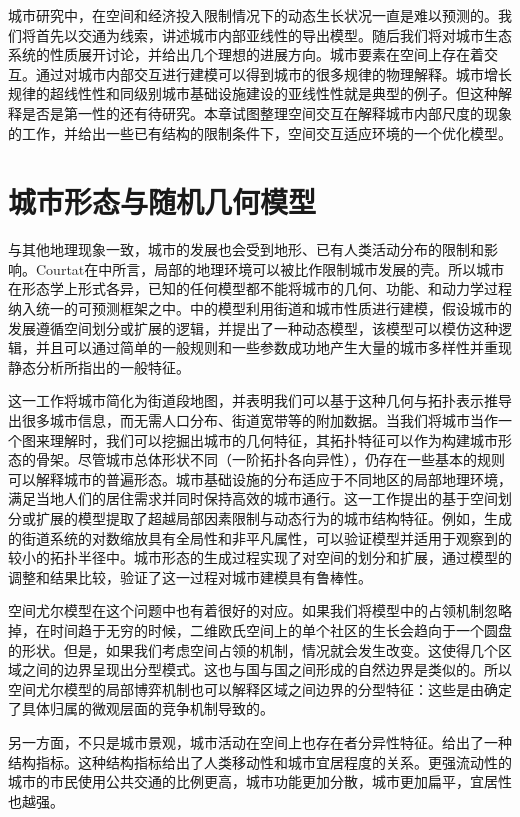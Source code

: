城市研究中，在空间和经济投入限制情况下的动态生长状况一直是难以预测的。我们将首先以交通为线索，讲述城市内部亚线性的导出模型。随后我们将对城市生态系统的性质展开讨论，并给出几个理想的进展方向。城市要素在空间上存在着交互。通过对城市内部交互进行建模可以得到城市的很多规律的物理解释。城市增长规律的超线性性和同级别城市基础设施建设的亚线性性就是典型的例子。但这种解释是否是第一性的还有待研究。本章试图整理空间交互在解释城市内部尺度的现象的工作，并给出一些已有结构的限制条件下，空间交互适应环境的一个优化模型。

\section{城市形态与随机几何模型}

与其他地理现象一致，城市的发展也会受到地形、已有人类活动分布的限制和影响。Courtat在\cite{Courtat2011}中所言，局部的地理环境可以被比作限制城市发展的壳。所以城市在形态学上形式各异，已知的任何模型都不能将城市的几何、功能、和动力学过程纳入统一的可预测框架之中。\cite{Courtat2011}中的模型利用街道和城市性质进行建模，假设城市的发展遵循空间划分或扩展的逻辑，并提出了一种动态模型，该模型可以模仿这种逻辑，并且可以通过简单的一般规则和一些参数成功地产生大量的城市多样性并重现静态分析所指出的一般特征。

这一工作将城市简化为街道段地图，并表明我们可以基于这种几何与拓扑表示推导出很多城市信息，而无需人口分布、街道宽带等的附加数据。当我们将城市当作一个图来理解时，我们可以挖掘出城市的几何特征，其拓扑特征可以作为构建城市形态的骨架。尽管城市总体形状不同（一阶拓扑各向异性），仍存在一些基本的规则可以解释城市的普遍形态。城市基础设施的分布适应于不同地区的局部地理环境，满足当地人们的居住需求并同时保持高效的城市通行。这一工作提出的基于空间划分或扩展的模型提取了超越局部因素限制与动态行为的城市结构特征。例如，生成的街道系统的对数缩放具有全局性和非平凡属性，可以验证模型并适用于观察到的较小的拓扑半径中。城市形态的生成过程实现了对空间的划分和扩展，通过模型的调整和结果比较，验证了这一过程对城市建模具有鲁棒性。

空间尤尔模型在这个问题中也有着很好的对应。如果我们将模型中的占领机制忽略掉，在时间趋于无穷的时候，二维欧氏空间上的单个社区的生长会趋向于一个圆盘的形状。但是，如果我们考虑空间占领的机制，情况就会发生改变。这使得几个区域之间的边界呈现出分型模式。这也与国与国之间形成的自然边界是类似的。所以空间尤尔模型的局部博弈机制也可以解释区域之间边界的分型特征：这些是由确定了具体归属的微观层面的竞争机制导致的。

另一方面，不只是城市景观，城市活动在空间上也存在者分异性特征。\cite{hierarchicalorganization}给出了一种结构指标。这种结构指标给出了人类移动性和城市宜居程度的关系。更强流动性的城市的市民使用公共交通的比例更高，城市功能更加分散，城市更加扁平，宜居性也越强。

